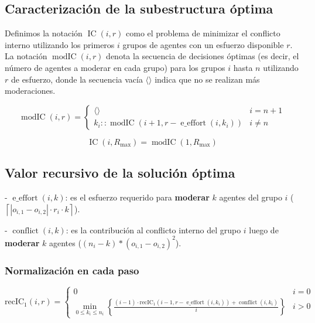 \subsection{Caracterización de la subestructura óptima}

Definimos la notación $\operatorname{ IC }(i,r)$ como el problema de minimizar el conflicto interno utilizando los primeros $i$ grupos de agentes con un esfuerzo disponible $r$. La notación $\operatorname{ modIC }(i,r)$ denota la secuencia de decisiones óptimas (es decir, el número de agentes a moderar en cada grupo) para los grupos $i$ hasta $n$ utilizando $r$ de esfuerzo, donde la secuencia vacía $\langle \rangle$ indica que no se realizan más moderaciones.

\begin{equation}
	\operatorname{ modIC }(i,r) = \begin{cases}
		\langle \rangle                                                             & i = n + 1 \\
		k_i :: \operatorname{ modIC }(i + 1,r - \operatorname{ e\_effort }(i,k_i))  & i \neq n
	\end{cases}
\end{equation}

\begin{equation}
	\operatorname{ IC }(i,R_{ \max }) = \operatorname{ modIC }(1,R_{ \max })
\end{equation}

\subsection{Valor recursivo de la solución óptima}

- $\operatorname{ e\_effort }(i,k)$: es el esfuerzo requerido para \textbf{moderar} $k$ agentes del grupo $i$ ($\left \lceil |o_{ i,1 } - o_{ i,2 }| \cdot r_i \cdot k \right \rceil$).

- $\operatorname{ conflict }(i,k)$: es la contribución al conflicto interno del grupo $i$ luego de \textbf{moderar} $k$ agentes ($(n_i - k) * (o_{ i,1 } - o_{ i,2 })^2$).

\subsubsection{Normalización en cada paso}

\begin{equation}
	\operatorname{ { recIC }_1 }(i,r) = \begin{cases}
		0                                                                                                                                                                                        & i = 0 \\
		\min_{ 0 \leq k_i \leq n_i } \left \{ \frac{ (i - 1) \cdot \operatorname{ { recIC }_1 }(i - 1,r - \operatorname{ e\_effort }(i,k_i)) + \operatorname{ conflict }(i,k_i) }{ i } \right \} & i > 0
	\end{cases}
\end{equation}


